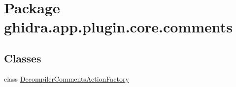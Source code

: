 \hypertarget{namespaceghidra_1_1app_1_1plugin_1_1core_1_1comments}{}\section{Package ghidra.\+app.\+plugin.\+core.\+comments}
\label{namespaceghidra_1_1app_1_1plugin_1_1core_1_1comments}
\subsection*{Classes}
\begin{DoxyCompactItemize}
\item 
class \mbox{\hyperlink{classghidra_1_1app_1_1plugin_1_1core_1_1comments_1_1_decompiler_comments_action_factory}{Decompiler\+Comments\+Action\+Factory}}
\end{DoxyCompactItemize}

